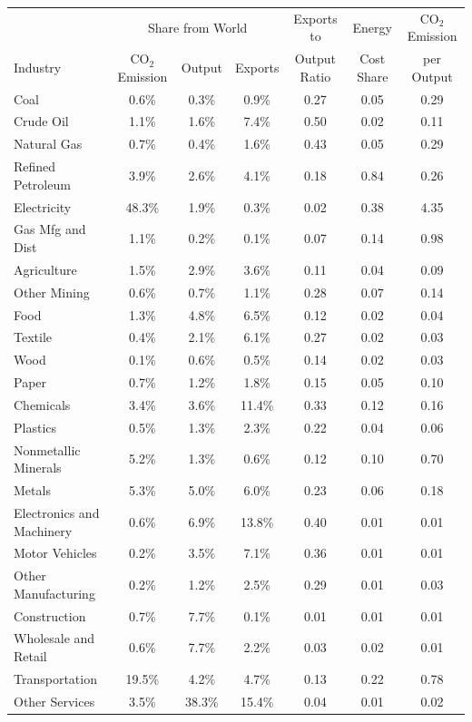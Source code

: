 \begin{center}
\small
\setlength{\tabcolsep}{4 pt} %
\renewcommand{\arraystretch}{1.1} %
\begin{tabular}{l ccc c c c}
\toprule
 & \multicolumn{3}{c}{Share from World} & Exports to & Energy & CO$_2$ Emission\\
\cline{2-4}
\addlinespace[3pt]
Industry & CO$_2$ Emission & Output & Exports & Output Ratio & Cost Share & per Output \\
\midrule
Coal & 0.6\% & 0.3\% & 0.9\% & 0.27 & 0.05 & 0.29 \\Crude Oil & 1.1\% & 1.6\% & 7.4\% & 0.50 & 0.02 & 0.11 \\Natural Gas & 0.7\% & 0.4\% & 1.6\% & 0.43 & 0.05 & 0.29 \\Refined Petroleum & 3.9\% & 2.6\% & 4.1\% & 0.18 & 0.84 & 0.26 \\Electricity & 48.3\% & 1.9\% & 0.3\% & 0.02 & 0.38 & 4.35 \\Gas Mfg and Dist & 1.1\% & 0.2\% & 0.1\% & 0.07 & 0.14 & 0.98 \\Agriculture & 1.5\% & 2.9\% & 3.6\% & 0.11 & 0.04 & 0.09 \\Other Mining & 0.6\% & 0.7\% & 1.1\% & 0.28 & 0.07 & 0.14 \\Food & 1.3\% & 4.8\% & 6.5\% & 0.12 & 0.02 & 0.04 \\Textile & 0.4\% & 2.1\% & 6.1\% & 0.27 & 0.02 & 0.03 \\Wood & 0.1\% & 0.6\% & 0.5\% & 0.14 & 0.02 & 0.03 \\Paper & 0.7\% & 1.2\% & 1.8\% & 0.15 & 0.05 & 0.10 \\Chemicals & 3.4\% & 3.6\% & 11.4\% & 0.33 & 0.12 & 0.16 \\Plastics & 0.5\% & 1.3\% & 2.3\% & 0.22 & 0.04 & 0.06 \\Nonmetallic Minerals & 5.2\% & 1.3\% & 0.6\% & 0.12 & 0.10 & 0.70 \\Metals & 5.3\% & 5.0\% & 6.0\% & 0.23 & 0.06 & 0.18 \\Electronics and Machinery & 0.6\% & 6.9\% & 13.8\% & 0.40 & 0.01 & 0.01 \\Motor Vehicles & 0.2\% & 3.5\% & 7.1\% & 0.36 & 0.01 & 0.01 \\Other Manufacturing & 0.2\% & 1.2\% & 2.5\% & 0.29 & 0.01 & 0.03 \\Construction & 0.7\% & 7.7\% & 0.1\% & 0.01 & 0.01 & 0.01 \\Wholesale and Retail & 0.6\% & 7.7\% & 2.2\% & 0.03 & 0.02 & 0.01 \\Transportation & 19.5\% & 4.2\% & 4.7\% & 0.13 & 0.22 & 0.78 \\Other Services & 3.5\% & 38.3\% & 15.4\% & 0.04 & 0.01 & 0.02 \\\bottomrule
\end{tabular}
\end{center}
